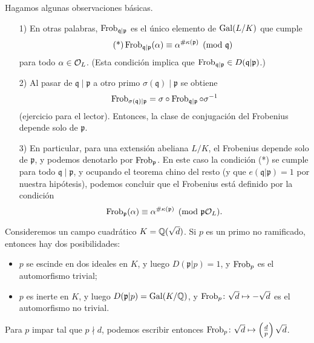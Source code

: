 \begin{comentario}
  Hagamos algunas observaciones básicas.

  \begin{enumerate}
  \item[1)] En otras palabras, $\operatorname{Frob}_{\mathfrak{q}|\mathfrak{p}}$ es el
    único elemento de $\operatorname{Gal} (L/K)$ que cumple
    \[ \tag{*} \operatorname{Frob}_{\mathfrak{q}|\mathfrak{p}} (\alpha) \equiv
               \alpha^{\# \kappa (\mathfrak{p})} \pmod{\mathfrak{q}} \]
    para todo $\alpha \in \mathcal{O}_L$. (Esta condición implica que
    $\operatorname{Frob}_{\mathfrak{q}|\mathfrak{p}} \in D (\mathfrak{q}|\mathfrak{p})$.)

  \item[2)] Al pasar de $\mathfrak{q}\mid\mathfrak{p}$ a otro primo
    $\sigma(\mathfrak{q})\mid\mathfrak{p}$ se obtiene
    $$\operatorname{Frob}_{\sigma(\mathfrak{q})|\mathfrak{p}} = \sigma \circ \operatorname{Frob}_{\mathfrak{q}|\mathfrak{p}} \circ \sigma^{-1}$$
    (ejercicio para el lector). Entonces, la clase de conjugación del Frobenius
    depende solo de $\mathfrak{p}$.

  \item[3)] En particular, para una extensión abeliana $L/K$, el Frobenius
    depende solo de $\mathfrak{p}$, y podemos denotarlo por
    $\operatorname{Frob}_\mathfrak{p}$. En este caso la condición (*) se cumple para todo
    $\mathfrak{q}\mid\mathfrak{p}$, y ocupando el teorema chino del resto
    (y que $e (\mathfrak{q}|\mathfrak{p}) = 1$ por nuestra hipótesis),
    podemos concluir que el Frobenius está definido por la condición
    \[ \operatorname{Frob}_\mathfrak{p} (\alpha) \equiv
       \alpha^{\# \kappa (\mathfrak{p})} \pmod{\mathfrak{p}\mathcal{O}_L}. \]
  \end{enumerate}
\end{comentario}

\begin{ejemplo}
  Consideremos un campo cuadrático $K = \mathbb{Q} (\sqrt{d})$. Si $p$ es un primo no
  ramificado, entonces hay dos posibilidades:
  \begin{itemize}
  \item $p$ se escinde en dos ideales en $K$, y luego
    $D (\mathfrak{p}|p) = 1$, y $\operatorname{Frob}_p$ es el automorfismo trivial;

  \item $p$ es inerte en $K$, y luego $D (\mathfrak{p}|p) = \operatorname{Gal} (K/\mathbb{Q})$,
    y $\operatorname{Frob}_p\colon \sqrt{d}\mapsto -\sqrt{d}$ es el automorfismo no trivial.
  \end{itemize}

  Para $p$ impar tal que $p \nmid d$, podemos escribir entonces
  $\operatorname{Frob}_p\colon \sqrt{d} \mapsto \left(\frac{d}{p}\right)\sqrt{d}$.
\end{ejemplo}

